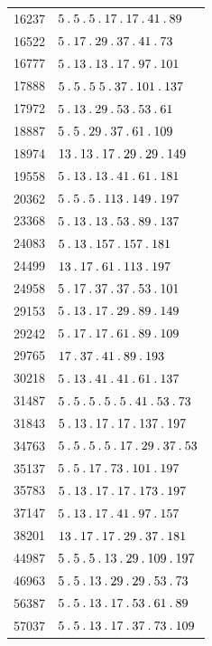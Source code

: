 \begin{longtable}{@{}r|l@{}}
16237 & $5\pdot 5\pdot 5\pdot 17\pdot 17\pdot 41\pdot 89$\\
16522 & $5\pdot 17\pdot 29\pdot 37\pdot 41\pdot 73$\\
16777 & $5\pdot 13\pdot 13\pdot 17\pdot 97\pdot 101$\\
17888 & $5\pdot 5\pdot 5\;5\pdot 37\pdot 101\pdot 137$\\
17972 & $5\pdot 13\pdot 29\pdot 53\pdot 53\pdot 61$\\
18887 & $5\pdot 5\pdot 29\pdot 37\pdot 61\pdot 109$\\
18974 & $13\pdot 13\pdot 17\pdot 29\pdot 29\pdot 149$\\
19558 & $5\pdot 13\pdot 13\pdot 41\pdot 61\pdot 181$\\
20362 & $5\pdot 5\pdot 5\pdot 113\pdot 149\pdot 197$\\
23368 & $5\pdot 13\pdot 13\pdot 53\pdot 89\pdot 137$\\
24083 & $5\pdot 13\pdot 157\pdot 157\pdot 181$\\
24499 & $13\pdot 17\pdot 61\pdot 113\pdot 197$\\
24958 & $5\pdot 17\pdot 37\pdot 37\pdot 53\pdot 101$\\
29153 & $5\pdot 13\pdot 17\pdot 29\pdot 89\pdot 149$\\
29242 & $5\pdot 17\pdot 17\pdot 61\pdot 89\pdot 109$\\
29765 & $17\pdot 37\pdot 41\pdot 89\pdot 193$\\
30218 & $5\pdot 13\pdot 41\pdot 41\pdot 61\pdot 137$\\
31487 & $5\pdot 5\pdot 5\pdot 5\pdot 5\pdot 41\pdot 53\pdot 73$\\
31843 & $5\pdot 13\pdot 17\pdot 17\pdot 137\pdot 197$\\
34763 & $5\pdot 5\pdot 5\pdot 5\pdot 17\pdot 29\pdot 37\pdot 53$\\
35137 & $5\pdot 5\pdot 17\pdot 73\pdot 101\pdot 197$\\
35783 & $5\pdot 13\pdot 17\pdot 17\pdot 173\pdot 197$\\
37147 & $5\pdot 13\pdot 17\pdot 41\pdot 97\pdot 157$\\
38201 & $13\pdot 17\pdot 17\pdot 29\pdot 37\pdot 181$\\
44987 & $5\pdot 5\pdot 5\pdot 13\pdot 29\pdot 109\pdot 197$\\
46963 & $5\pdot 5\pdot 13\pdot 29\pdot 29\pdot 53\pdot 73$\\
56387 & $5\pdot 5\pdot 13\pdot 17\pdot 53\pdot 61\pdot 89$\\
57037 & $5\pdot 5\pdot 13\pdot 17\pdot 37\pdot 73\pdot 109$\\

\end{longtable}
